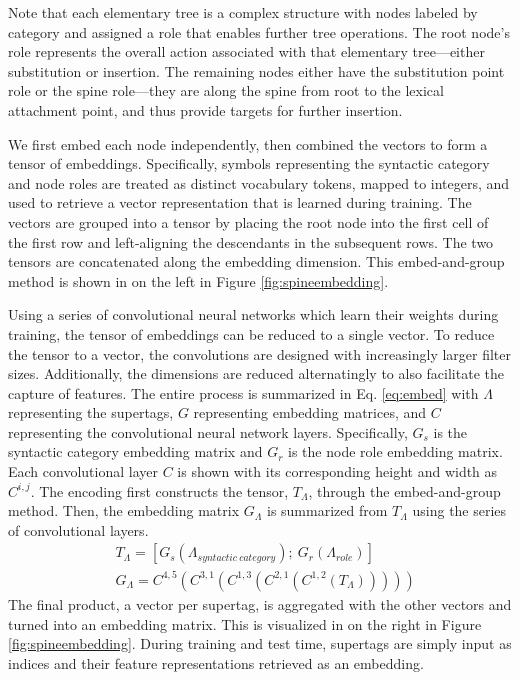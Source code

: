 \documentclass[11pt]{article}
\begin{document}
Note that each elementary tree is a complex structure with nodes
labeled by category and assigned a role that enables further tree
operations.
%
The root node's role represents the overall action associated with
that elementary tree---either substitution or insertion.
%
The remaining nodes either have the substitution point role or the
spine role---they are along the spine from root to the lexical
attachment point, and thus provide targets for further insertion.

We first embed each node independently, then combined the vectors to
form a tensor of embeddings.
%
Specifically, symbols representing the syntactic category and node
roles are treated as distinct vocabulary tokens, mapped to integers,
and used to retrieve a vector representation that is learned during
training.
%
The vectors are grouped into a tensor by placing the root node into
the first cell of the first row and left-aligning the descendants in
the subsequent rows.
%
The two tensors are concatenated along the embedding dimension.
%
This embed-and-group method is shown in on the left in Figure \ref{fig:spineembedding}.


Using a series of convolutional neural networks which learn their weights during training, the tensor of embeddings can be reduced to a single vector.
%
To reduce the tensor to a vector, the convolutions are designed with increasingly larger filter sizes.
%
Additionally, the dimensions are reduced alternatingly to also facilitate the capture of features.
%
The entire process is summarized in Eq. \ref{eq:embed} with $\Lambda$ representing the supertags, $G$ representing embedding matrices, and
$C$ representing the convolutional neural network layers.
%
Specifically, $G_s$ is the syntactic category embedding matrix and
$G_r$ is the node role embedding matrix.
%
Each convolutional layer $C$ is shown with its corresponding height and width as $C^{i,j}$.
%
The encoding first constructs the tensor, $T_\Lambda$, through the embed-and-group method.
%
Then, the embedding matrix $G_\Lambda$ is summarized from $T_\Lambda$ using the
series of convolutional layers.
%
\begin{align}
& T_\Lambda = [G_s(\Lambda_{syntactic~category});~G_r(\Lambda_{role})] \nonumber \\
& G_\Lambda = C^{4,5}(C^{3,1}(C^{1,3}(C^{2,1}(C^{1,2}(T_\Lambda))))) \label{eq:embed}
\end{align}
%
The final product, a vector per supertag, is aggregated with the other vectors
and turned into an embedding matrix.
%
This is visualized in on the right in Figure \ref{fig:spineembedding}.
%
During training and test time, supertags are simply input as indices
and their feature representations retrieved as an embedding.
\end{document}
